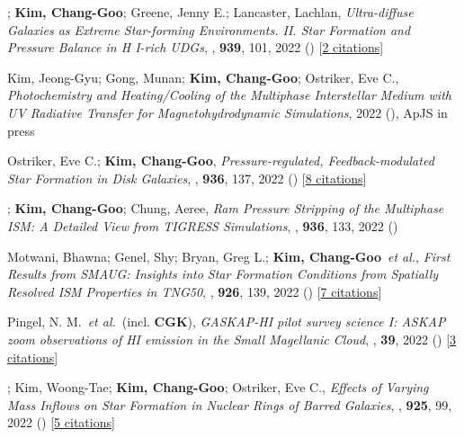 \item[{43.}]; \textbf{Kim, Chang-Goo}; Greene, Jenny E.; Lancaster, Lachlan, \textit{Ultra-diffuse Galaxies as Extreme Star-forming Environments. II. Star Formation and Pressure Balance in H I-rich UDGs}, , \textbf{939}, 101, 2022 () [\href{http://adsabs.harvard.edu/abs/2022ApJ...939..101K}{2 citations}]

\item[{42.}]Kim, Jeong-Gyu; Gong, Munan; \textbf{Kim, Chang-Goo}; Ostriker, Eve C., \textit{Photochemistry and Heating/Cooling of the Multiphase Interstellar Medium with UV Radiative Transfer for Magnetohydrodynamic Simulations}, 2022 (), ApJS in press

\item[{41.}]Ostriker, Eve C.; \textbf{Kim, Chang-Goo}, \textit{Pressure-regulated, Feedback-modulated Star Formation in Disk Galaxies}, , \textbf{936}, 137, 2022 () [\href{http://adsabs.harvard.edu/abs/2022ApJ...936..137O}{8 citations}]

\item[{40.}]; \textbf{Kim, Chang-Goo}; Chung, Aeree, \textit{Ram Pressure Stripping of the Multiphase ISM: A Detailed View from TIGRESS Simulations}, , \textbf{936}, 133, 2022 ()

\item[{39.}]Motwani, Bhawna; Genel, Shy; Bryan, Greg L.; \textbf{Kim, Chang-Goo}~\textit{et al.}, \textit{First Results from SMAUG: Insights into Star Formation Conditions from Spatially Resolved ISM Properties in TNG50}, , \textbf{926}, 139, 2022 () [\href{http://adsabs.harvard.edu/abs/2022ApJ...926..139M}{7 citations}]

\item[{38.}]Pingel, N. M.~\textit{et al.}~(incl. \textbf{CGK}), \textit{GASKAP-HI pilot survey science I: ASKAP zoom observations of HI emission in the Small Magellanic Cloud}, , \textbf{39}, 2022 () [\href{http://adsabs.harvard.edu/abs/2022PASA...39....5P}{3 citations}]

\item[{37.}]; Kim, Woong-Tae; \textbf{Kim, Chang-Goo}; Ostriker, Eve C., \textit{Effects of Varying Mass Inflows on Star Formation in Nuclear Rings of Barred Galaxies}, , \textbf{925}, 99, 2022 () [\href{http://adsabs.harvard.edu/abs/2022ApJ...925...99M}{5 citations}]

